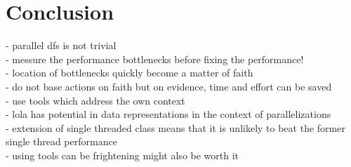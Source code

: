 \chapter{Conclusion}
- parallel dfs is not trivial\\
- messure the performance bottlenecks before fixing the performance!\\
- location of bottlenecks quickly become a matter of faith \\
- do not base actions on faith but on evidence, time and effort can be saved\\
- use tools which address the own context\\
- lola has potential in data representations in the context of parallelizations\\

- extension of single threaded class means that it is unlikely to beat the former single thread performance\\

- using tools can be frightening might also be worth it 